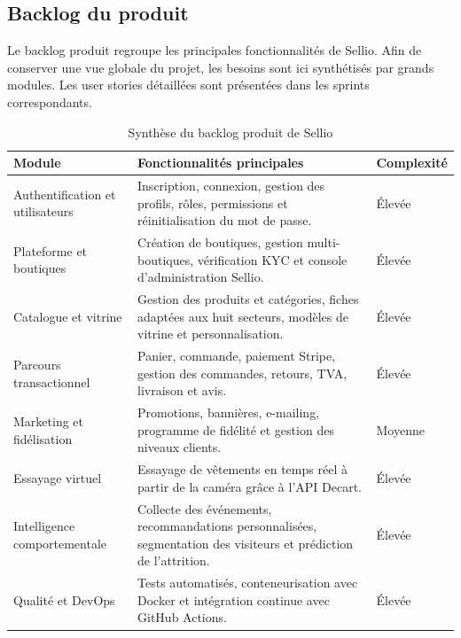 \subsection{Backlog du produit}

Le backlog produit regroupe les principales fonctionnalités de Sellio. 
Afin de conserver une vue globale du projet, les besoins sont ici synthétisés 
par grands modules. Les user stories détaillées sont présentées dans les sprints correspondants.

\begin{table}[H]
\centering
\renewcommand{\arraystretch}{1.3}
\begin{tabular}{|p{2.9cm}|p{9.5cm}|p{2.5cm}|}
\hline
\textbf{Module} & \textbf{Fonctionnalités principales} & \textbf{Complexité} \\
\hline

Authentification et utilisateurs &
Inscription, connexion, gestion des profils, rôles, permissions et réinitialisation du mot de passe. &
Élevée \\
\hline

Plateforme et boutiques &
Création de boutiques, gestion multi-boutiques, vérification KYC et console d'administration Sellio. &
Élevée \\
\hline

Catalogue et vitrine &
Gestion des produits et catégories, fiches adaptées aux huit secteurs, modèles de vitrine et personnalisation. &
Élevée \\
\hline

Parcours transactionnel &
Panier, commande, paiement Stripe, gestion des commandes, retours, TVA, livraison et avis. &
Élevée \\
\hline

Marketing et fidélisation &
Promotions, bannières, e-mailing, programme de fidélité et gestion des niveaux clients. &
Moyenne \\
\hline

Essayage virtuel &
Essayage de vêtements en temps réel à partir de la caméra grâce à l'API Decart. &
Élevée \\
\hline

Intelligence comportementale &
Collecte des événements, recommandations personnalisées, segmentation des visiteurs et prédiction de l'attrition. &
Élevée \\
\hline

Qualité et DevOps &
Tests automatisés, conteneurisation avec Docker et intégration continue avec GitHub Actions. &
Élevée \\
\hline

\end{tabular}
\caption{Synthèse du backlog produit de Sellio}
\label{tab:backlog-produit}
\end{table}

